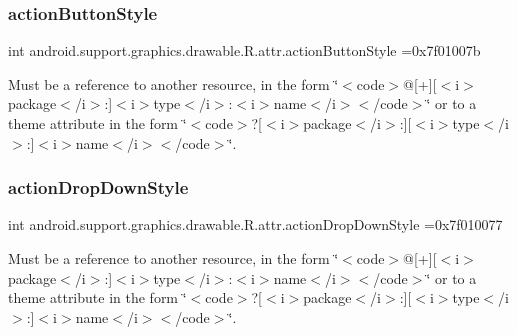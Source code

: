 \subsubsection{\texorpdfstring{action\+Button\+Style}{actionButtonStyle}}
{\footnotesize\ttfamily int android.\+support.\+graphics.\+drawable.\+R.\+attr.\+action\+Button\+Style =0x7f01007b\hspace{0.3cm}{\ttfamily [static]}}

Must be a reference to another resource, in the form \char`\"{}$<$code$>$@\mbox{[}+\mbox{]}\mbox{[}$<$i$>$package$<$/i$>$\+:\mbox{]}$<$i$>$type$<$/i$>$\+:$<$i$>$name$<$/i$>$$<$/code$>$\char`\"{} or to a theme attribute in the form \char`\"{}$<$code$>$?\mbox{[}$<$i$>$package$<$/i$>$\+:\mbox{]}\mbox{[}$<$i$>$type$<$/i$>$\+:\mbox{]}$<$i$>$name$<$/i$>$$<$/code$>$\char`\"{}. \mbox{\label{classandroid_1_1support_1_1graphics_1_1drawable_1_1R_1_1attr_adab33235f3e372a911296ce88e0ff560}} 
\subsubsection{\texorpdfstring{action\+Drop\+Down\+Style}{actionDropDownStyle}}
{\footnotesize\ttfamily int android.\+support.\+graphics.\+drawable.\+R.\+attr.\+action\+Drop\+Down\+Style =0x7f010077\hspace{0.3cm}{\ttfamily [static]}}

Must be a reference to another resource, in the form \char`\"{}$<$code$>$@\mbox{[}+\mbox{]}\mbox{[}$<$i$>$package$<$/i$>$\+:\mbox{]}$<$i$>$type$<$/i$>$\+:$<$i$>$name$<$/i$>$$<$/code$>$\char`\"{} or to a theme attribute in the form \char`\"{}$<$code$>$?\mbox{[}$<$i$>$package$<$/i$>$\+:\mbox{]}\mbox{[}$<$i$>$type$<$/i$>$\+:\mbox{]}$<$i$>$name$<$/i$>$$<$/code$>$\char`\"{}. \mbox{\label{classandroid_1_1support_1_1graphics_1_1drawable_1_1R_1_1attr_a1ce4445f0ef21ae81bf9bdb7d4a62e07}} 
